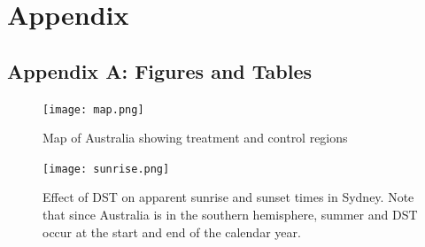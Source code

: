 \newpage
{}
\section*{Appendix}



\FloatBarrier
{}
\subsection*{Appendix A: Figures and Tables}

\begin{figure}[ht]
    \centering
    \texttt{[image: map.png]}
    \caption{Map of Australia showing treatment and control regions}
    \label{fig:map}
\end{figure}

\begin{figure}[ht]
    \centering
    \texttt{[image: sunrise.png]}
    \caption[Effect of \acs{DST} on apparent sunrise and sunset times in Sydney]{Effect of \acs{DST} on apparent sunrise and sunset times in Sydney. Note that since Australia is in the southern hemisphere, summer and \acs{DST} occur at the start and end of the calendar year.}
    \label{fig:sunrise plot}
\end{figure}

